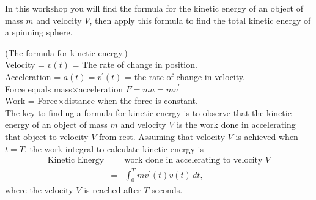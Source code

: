 \documentclass[letterpaper,11pt]{examPTP}
\begin{document}
\pagestyle{headandfoot}


\noindent \underline{\hspace{6.5in}}


\begin{center}
\addpoints
\gradetable[h]  
\end{center}
\workshopinstructions

In this workshop you will find the formula for the kinetic energy of an object of mass $m$ and velocity $V$, then apply this formula to find the total kinetic energy of a spinning sphere.


\begin{questions}


\question (The formula for kinetic energy.)\\
Velocity = $v(t)$ = The rate of change in position.\\
Acceleration = $a(t) = v^{\prime}(t)$ = the rate of change in velocity.\\
Force equals mass$\times$acceleration $F = ma = mv^{\prime}$\\
Work = Force$\times$distance when the force is constant.\\

The key to finding a formula for kinetic energy is to observe that the kinetic energy of an object of mass $m$ and velocity $V$ is the work done in accelerating that object to velocity $V$ from rest. Assuming that velocity $V$ is achieved when $t=T$, the work integral to calculate kinetic energy is
\begin{eqnarray*}
\mbox{Kinetic Energy} & = & \mbox{work done in accelerating to velocity $V$}\\
\ & = & \int_{0}^{T} mv^{\prime}(t)v(t)\,dt,
\end{eqnarray*}
where the velocity $V$ is reached after $T$ seconds.


\end{questions}
\end{document}
